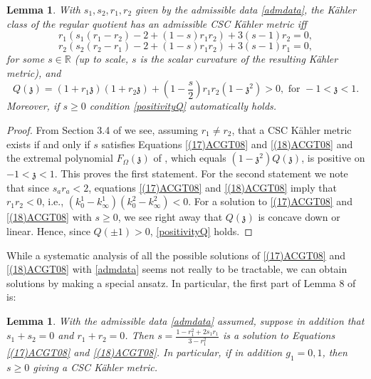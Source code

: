\documentclass[12pt]{amsart}
\newtheorem{lemma}[theorem]{Lemma}
\def\bbr{{\mathbb R}}
\def\grO{\Omega}
\def\gz{{\mathfrak z}}
\begin{document}
\begin{lemma}\label{ACGT08lemma7}
With $s_1,s_2,r_1,r_2$ given by the admissible data \eqref{admdata}, the K\"ahler class of the regular quotient has an admissible CSC K\"ahler metric iff
\begin{equation}\label{(17)ACGT08}
r_1(s_1(r_1-r_2)-2+(1-s)r_1r_2)+3(s-1)r_2=0,
\end{equation}
\begin{equation}\label{(18)ACGT08}
r_2(s_2(r_2-r_1)-2+(1-s)r_1r_2)+3(s-1)r_1=0,
\end{equation}
for some $s\in \bbr$ (up to scale, $s$ is the scalar curvature of the resulting K\"ahler metric), and
\begin{equation}\label{positivityQ}
Q(\gz)=(1+r_1\gz)(1+r_2\gz)+(1-\frac{s}{2})r_1r_2(1-\gz^2)>0, \,\, \text{for} \,\, -1<\gz<1.
\end{equation}
Moreover, if $s\geq 0$ condition \eqref{positivityQ} automatically holds.
\end{lemma}

\begin{proof}
From Section 3.4 of \cite{ACGT08} we see, assuming $r_1\neq r_2$, that a CSC K\"ahler metric exists if and only if $s$ satisfies Equations \eqref{(17)ACGT08} and \eqref{(18)ACGT08} and the extremal polynomial $F_\grO(\gz)$ of \cite{ACGT08}, which equals $(1-\gz^2)Q(\gz)$, is positive on $-1<\gz<1$. This proves the first statement.
For the second statement we note that since $s_a r_a<2$, equations \eqref{(17)ACGT08} and \eqref{(18)ACGT08} imply that $r_1r_2<0$, i.e., $(k^1_0-k^1_\infty)(k^2_0-k^2_\infty)<0.$ For a solution to \eqref{(17)ACGT08} and \eqref{(18)ACGT08} with $s\geq 0$, we see right away that $Q(\gz)$ is concave down or linear. Hence, since $Q(\pm 1)>0$, \eqref{positivityQ} holds.
\end{proof}

\bigskip

While a systematic analysis of all the possible solutions of \eqref{(17)ACGT08} and \eqref{(18)ACGT08} with \eqref{admdata} seems not really to be tractable, we can obtain solutions by making a special ansatz. In particular, the first part of Lemma 8 of \cite{ACGT08} is:

\begin{lemma}\cite{ACGT08}\label{ACGT08lemma}
With the admissible data \eqref{admdata} assumed, suppose in addition that $s_1+s_2=0$ and $r_1+r_2=0$. Then
$s=\frac{1-r_1^2+2s_1r_1}{3-r_1^2}$ is a solution to Equations \eqref{(17)ACGT08} and \eqref{(18)ACGT08}. In particular, if in addition $g_1=0,1$, then $s\geq 0$ giving a CSC K\"ahler metric.
\end{lemma}
\end{document}
